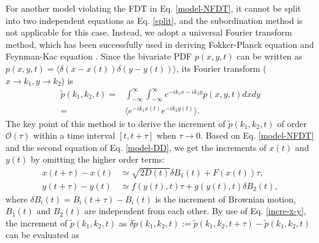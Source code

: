 \documentclass[aps,pre,twocolumn,groupedaddress,longbibliography]{revtex4-2}
\begin{document}
For another model violating the FDT in Eq. \eqref{model-NFDT}, it cannot be split into two independent equations as Eq. \eqref{split}, and the subordination method is not applicable for this case. Instead, we adopt a universal Fourier transform method, which has been successfully used in deriving Fokker-Planck equation and Feynman-Kac equation \cite{DenisovHorsthemkeHanggi:2009,WangChenDeng:2018}.
Since the bivariate PDF $p(x,y,t)$ can be written as
$p(x,y,t)=\langle \delta(x-x(t))\delta(y-y(t))\rangle$, its Fourier transform ($x\rightarrow k_1, y\rightarrow k_2$) is
\begin{equation}
\begin{split}
  \tilde{p}(k_1,k_2,t)=& \int_{-\infty}^\infty\int_{-\infty}^\infty e^{-ik_1x-ik_2y}p(x,y,t)dxdy  \\
  =& \langle e^{-ik_1x(t)}e^{-ik_2y(t)}\rangle.
\end{split}
\end{equation}
The key point of this method is to derive the increment of $\tilde{p}(k_1,k_2,t)$ of order $\mathcal{O}(\tau)$ within a time interval $[t,t+\tau]$ when $\tau\rightarrow0$. Based on Eq. \eqref{model-NFDT} and the second equation of Eq. \eqref{model-DD}, we get the increments of $x(t)$ and $y(t)$ by omitting the higher order terms:
\begin{equation}\label{incre-x-y}
\begin{split}
x(t+\tau)-x(t)&\simeq\sqrt{2D(t)}\delta B_1(t)+F(x(t))\tau, \\[3pt]
y(t+\tau)-y(t)&\simeq f(y(t),t)\tau+g(y(t),t)\delta B_2(t),
\end{split}
\end{equation}
where $\delta B_i(t)=B_i(t+\tau)-B_i(t)$ is the increment of Brownian motion, $B_1(t)$ and $B_2(t)$ are independent from each other. By use of Eq. \eqref{incre-x-y}, the increment of $\tilde{p}(k_1,k_2,t)$ as $\delta \tilde{p}(k_1,k_2,t):=\tilde{p}(k_1,k_2,t+\tau)-\tilde{p}(k_1,k_2,t)$ can be evaluated as \\
\end{document}
